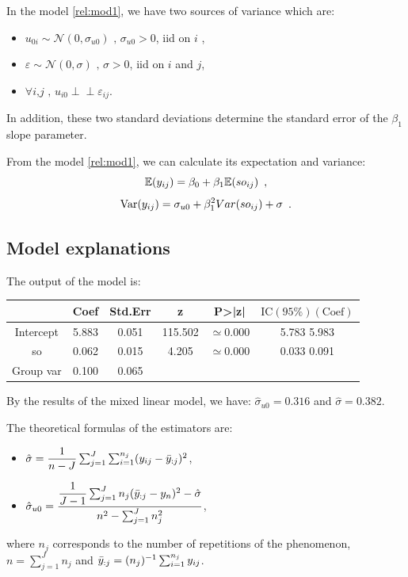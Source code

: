 \documentclass{article}
\begin{document}
In the model \eqref{rel:mod1}, we have two sources of variance which are:
\begin{itemize}
    \item $u_{0i} \sim \mathcal{N}(0,\sigma_{u0}) \text{ , } \sigma_{u0}>0$, iid on $i$ \enspace,
    \item $\varepsilon \sim \mathcal{N}(0, \sigma) \text{ , } \sigma >0$, iid on $i$ and $j$\enspace,
    \item $\forall i \text{,} j \text{ , } u_{i0} \perp \!\!\! \perp \varepsilon_{ij}$\enspace.
\end{itemize}

In addition, these two standard deviations determine the standard error of the $\beta_1$ slope parameter.

From the model \eqref{rel:mod1}, we can calculate its expectation and variance: 
$$\mathbb{E}(y_{ij})=\beta_0 + \beta_1 \mathbb{E}(so_{ij}) \enspace,$$
$$\operatorname{Var}(y_{ij})=\sigma_{u0} + \beta_1^2 Var(so_{ij}) + \sigma \enspace.$$

\subsection{Model explanations}
The output of the model is:
\begin{center}
    \begin{tabular}{|c|c|c|c|c|c|}
    \hline
         & Coef & Std.Err & z & P>|z| &$\text{IC}(95\%)(\text{Coef})$  \\
         \hline \hline
        Intercept & 5.883 & 0.051 & 115.502 & $\simeq$0.000 & 5.783 5.983\\
         so & 0.062 & 0.015 & 4.205 & $\simeq$0.000 & 0.033 0.091 \\
         Group var &  0.100 & 0.065 &  & &  \\
         \hline
    \end{tabular}
\end{center}


By the results of the mixed linear model, we have:
$\hat{\sigma}_{u0}=0.316$ and $\hat{\sigma}=0.382$.

The theoretical formulas of the estimators are:
\begin{itemize}
    \item $\hat{\sigma}=\dfrac{1}{n-J} \sum_{j=1}^{J} \sum_{i=1}^{n_j} (y_{ij}-\Bar{y}_{:j})^2$,
    \item $\hat{\sigma}_{u0}=\dfrac{\dfrac{1}{J-1} \sum_{j=1}^J n_j(\Bar{y}_{:j}-y_n)^2 - \hat{\sigma}}{n^2 - \sum_{j=1}^J n_j^2}$,
\end{itemize}
where $n_j$ corresponds to the number of repetitions of the phenomenon, $n=\sum_{j=1}^J n_j$ and $\Bar{y}_{:j}=(n_j)^{-1}\sum_{i=1}^{n_j} y_{ij}$.
\end{document}

